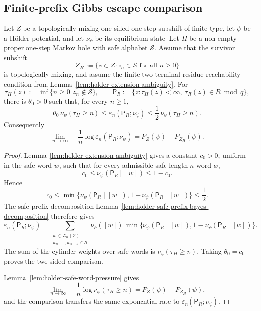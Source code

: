 \subsection{Finite-prefix Gibbs escape comparison}

\begin{lemma}
\label{lem:holder-one-step-error-comparison}
Let \(Z\) be a topologically mixing one-sided one-step subshift of finite
type, let \(\psi\) be a H\"older potential, and let \(\nu_\psi\) be its
equilibrium state.  Let \(H\) be a non-empty proper one-step Markov hole
with safe alphabet \(\mathcal S\).  Assume that the survivor subshift
\[
  Z_H:=\{z\in Z:z_n\in\mathcal S\text{ for all }n\geq0\}
\]
is topologically mixing, and assume the finite two-terminal residue
reachability condition from
Lemma~\ref{lem:holder-extension-ambiguity}.  For
\[
  \tau_H(z):=\inf\{n\geq0:z_n\notin\mathcal S\},
  \qquad
  \mathsf P_R:=\{z:\tau_H(z)<\infty,\ \tau_H(z)\in R\bmod q\},
\]
there is \(\theta_0>0\) such that, for every \(n\geq1\),
\[
  \theta_0\,\nu_{\psi}(\tau_H\geq n)
  \leq
  \varepsilon_n(\mathsf P_R;\nu_{\psi})
  \leq
  \frac12\,\nu_{\psi}(\tau_H\geq n).
\]
Consequently
\[
  \lim_{n\to\infty}
  -\frac1n\log\varepsilon_n(\mathsf P_R;\nu_\psi)
  =
  P_Z(\psi)-P_{Z_H}(\psi).
\]
\end{lemma}

\begin{proof}
Lemma~\ref{lem:holder-extension-ambiguity} gives a constant \(c_0>0\),
uniform in the safe word \(w\), such that for every admissible safe
length-\(n\) word \(w\),
\[
  c_0
  \leq
  \nu_\psi(\mathsf P_R\mid[w])
  \leq
  1-c_0 .
\]
Hence
\[
  c_0
  \leq
  \min\{
    \nu_\psi(\mathsf P_R\mid[w]),
    1-\nu_\psi(\mathsf P_R\mid[w])
  \}
  \leq \frac12 .
\]
The safe-prefix decomposition
Lemma~\ref{lem:holder-safe-prefix-bayes-decomposition} therefore gives
\[
  \varepsilon_n(\mathsf P_R;\nu_\psi)
  =
  \sum_{\substack{w\in\mathcal L_n(Z)\\
                  w_0,\ldots,w_{n-1}\in\mathcal S}}
    \nu_\psi([w])\,
    \min\{
      \nu_\psi(\mathsf P_R\mid[w]),
      1-\nu_\psi(\mathsf P_R\mid[w])
    \}.
\]
The sum of the cylinder weights over safe words is
\(\nu_\psi(\tau_H\geq n)\).  Taking \(\theta_0=c_0\) proves the
two-sided comparison.

Lemma~\ref{lem:holder-safe-word-pressure} gives
\[
  \lim_{n\to\infty}
  -\frac1n\log\nu_\psi(\tau_H\geq n)
  =
  P_Z(\psi)-P_{Z_H}(\psi),
\]
and the comparison transfers the same exponential rate to
\(\varepsilon_n(\mathsf P_R;\nu_\psi)\).
\end{proof}

